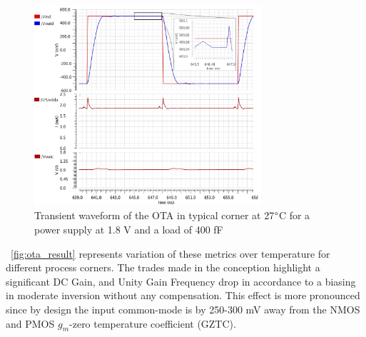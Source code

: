 \begin{figure}[htp]
    \centering
    \includegraphics[width=0.75\textwidth]{Chapter7/Figs/ota_transient_settling.jpg}
    \caption{Transient waveform of the OTA in typical corner at 27$\degree$C for a power supply at 1.8 V and a load of 400 fF}
    \label{fig:ota_settling_transient}
\end{figure}


\figurename~\ref{fig:ota_result} represents variation of these metrics over temperature for different process corners. The trades made in the conception highlight a significant DC Gain, and Unity Gain Frequency drop in accordance to a biasing in moderate inversion without any compensation. This effect is more pronounced since by design the input common-mode is by 250-300 mV away from the NMOS and PMOS \(g_m \)-zero temperature coefficient (GZTC).

